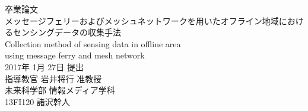 \thispagestyle{empty}
\begin{center}
\vspace*{-1cm}
\Huge{卒業論文}\\
\vspace{1cm}
\LARGE{メッセージフェリーおよびメッシュネットワークを用いたオフライン地域におけるセンシングデータの収集手法}\\
\vspace{0.2cm}
\large{Collection method of sensing data in offline area\\using message ferry and mesh network}\\
\vspace{2cm}
\Large{2017年 1月 27日 提出}\\
\vspace{2cm}
\LARGE{指導教官 岩井将行 准教授}\\
\vspace{1cm}
\LARGE{未来科学部 情報メディア学科}\\
\vspace{1cm}
\huge{13FI120 諸沢幹人}\\
\end{center}
